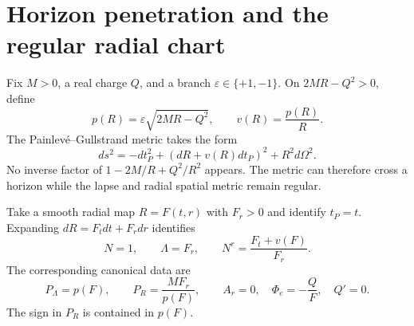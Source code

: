 \section{Horizon penetration and the regular radial chart}
\label{c:strong:RN-chart}

Fix $M>0$, a real charge $Q$, and a branch $\varepsilon\in\{+1,-1\}$. On $2MR-Q^2>0$, define
\begin{equation}
 p(R)=\varepsilon\sqrt{2MR-Q^2},\qquad v(R)=\frac{p(R)}R.
\end{equation}
The Painlev\'e--Gullstrand metric takes the form
\begin{equation}
 ds^2=-dt_P^2+(dR+v(R)dt_P)^2+R^2d\Omega^2.
\label{c:strong:RN-PG}
\end{equation}
No inverse factor of $1-2M/R+Q^2/R^2$ appears. The metric can therefore cross a horizon while the lapse and radial spatial metric remain regular.

Take a smooth radial map $R=F(t,r)$ with $F_r>0$ and identify $t_P=t$. Expanding $dR=F_tdt+F_rdr$ identifies
\begin{equation}
 N=1,\qquad \Lambda=F_r,\qquad N^r=\frac{F_t+v(F)}{F_r}.
\end{equation}
The corresponding canonical data are
\begin{equation}
 P_\Lambda=p(F),\qquad P_R=\frac{MF_r}{p(F)},
 \qquad A_r=0,\quad \Phi_e=-\frac QF,\quad Q'=0.
\label{c:strong:RN-data}
\end{equation}
The sign in $P_R$ is contained in $p(F)$.

